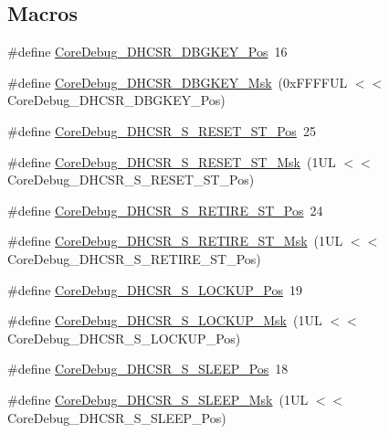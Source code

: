 \subsection*{Macros}
\begin{DoxyCompactItemize}
\item 
\#define \hyperlink{group__CMSIS__CoreDebug_gac91280edd0ce932665cf75a23d11d842}{Core\-Debug\-\_\-\-D\-H\-C\-S\-R\-\_\-\-D\-B\-G\-K\-E\-Y\-\_\-\-Pos}~16
\item 
\#define \hyperlink{group__CMSIS__CoreDebug_ga1ce997cee15edaafe4aed77751816ffc}{Core\-Debug\-\_\-\-D\-H\-C\-S\-R\-\_\-\-D\-B\-G\-K\-E\-Y\-\_\-\-Msk}~(0x\-F\-F\-F\-F\-U\-L $<$$<$ Core\-Debug\-\_\-\-D\-H\-C\-S\-R\-\_\-\-D\-B\-G\-K\-E\-Y\-\_\-\-Pos)
\item 
\#define \hyperlink{group__CMSIS__CoreDebug_ga6f934c5427ea057394268e541fa97753}{Core\-Debug\-\_\-\-D\-H\-C\-S\-R\-\_\-\-S\-\_\-\-R\-E\-S\-E\-T\-\_\-\-S\-T\-\_\-\-Pos}~25
\item 
\#define \hyperlink{group__CMSIS__CoreDebug_gac474394bcceb31a8e09566c90b3f8922}{Core\-Debug\-\_\-\-D\-H\-C\-S\-R\-\_\-\-S\-\_\-\-R\-E\-S\-E\-T\-\_\-\-S\-T\-\_\-\-Msk}~(1\-U\-L $<$$<$ Core\-Debug\-\_\-\-D\-H\-C\-S\-R\-\_\-\-S\-\_\-\-R\-E\-S\-E\-T\-\_\-\-S\-T\-\_\-\-Pos)
\item 
\#define \hyperlink{group__CMSIS__CoreDebug_ga2328118f8b3574c871a53605eb17e730}{Core\-Debug\-\_\-\-D\-H\-C\-S\-R\-\_\-\-S\-\_\-\-R\-E\-T\-I\-R\-E\-\_\-\-S\-T\-\_\-\-Pos}~24
\item 
\#define \hyperlink{group__CMSIS__CoreDebug_ga89dceb5325f6bcb36a0473d65fbfcfa6}{Core\-Debug\-\_\-\-D\-H\-C\-S\-R\-\_\-\-S\-\_\-\-R\-E\-T\-I\-R\-E\-\_\-\-S\-T\-\_\-\-Msk}~(1\-U\-L $<$$<$ Core\-Debug\-\_\-\-D\-H\-C\-S\-R\-\_\-\-S\-\_\-\-R\-E\-T\-I\-R\-E\-\_\-\-S\-T\-\_\-\-Pos)
\item 
\#define \hyperlink{group__CMSIS__CoreDebug_ga2900dd56a988a4ed27ad664d5642807e}{Core\-Debug\-\_\-\-D\-H\-C\-S\-R\-\_\-\-S\-\_\-\-L\-O\-C\-K\-U\-P\-\_\-\-Pos}~19
\item 
\#define \hyperlink{group__CMSIS__CoreDebug_ga7b67e4506d7f464ef5dafd6219739756}{Core\-Debug\-\_\-\-D\-H\-C\-S\-R\-\_\-\-S\-\_\-\-L\-O\-C\-K\-U\-P\-\_\-\-Msk}~(1\-U\-L $<$$<$ Core\-Debug\-\_\-\-D\-H\-C\-S\-R\-\_\-\-S\-\_\-\-L\-O\-C\-K\-U\-P\-\_\-\-Pos)
\item 
\#define \hyperlink{group__CMSIS__CoreDebug_ga349ccea33accc705595624c2d334fbcb}{Core\-Debug\-\_\-\-D\-H\-C\-S\-R\-\_\-\-S\-\_\-\-S\-L\-E\-E\-P\-\_\-\-Pos}~18
\item 
\#define \hyperlink{group__CMSIS__CoreDebug_ga98d51538e645c2c1a422279cd85a0a25}{Core\-Debug\-\_\-\-D\-H\-C\-S\-R\-\_\-\-S\-\_\-\-S\-L\-E\-E\-P\-\_\-\-Msk}~(1\-U\-L $<$$<$ Core\-Debug\-\_\-\-D\-H\-C\-S\-R\-\_\-\-S\-\_\-\-S\-L\-E\-E\-P\-\_\-\-Pos)
$$
\end{DoxyCompactItemize}
